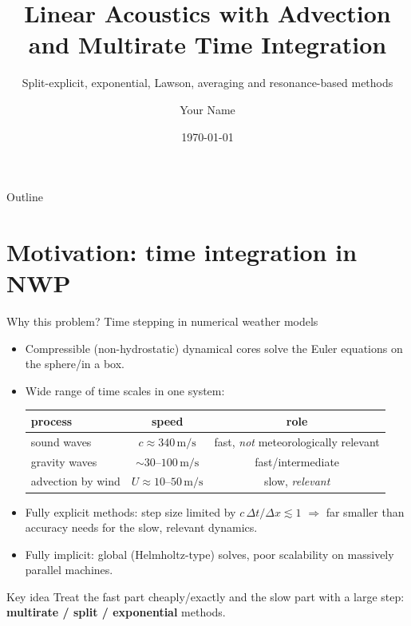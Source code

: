 \documentclass[aspectratio=169,10pt]{beamer}
\title[Acoustics with advection]{Linear Acoustics with Advection\\and Multirate Time Integration}
\subtitle{Split-explicit, exponential, Lawson, averaging and resonance-based methods}
\author{Your Name}
\institute[]{Your Institute}
\date{\today}
\begin{document}
	
	\begin{frame}
		\titlepage
	\end{frame}
	
	\begin{frame}{Outline}
		\tableofcontents
	\end{frame}
	
	\section{Motivation: time integration in NWP}
	
	\begin{frame}{Why this problem? Time stepping in numerical weather models}
		\begin{itemize}
			\item Compressible (non-hydrostatic) dynamical cores solve the Euler equations on the sphere/in a box.
			\item Wide range of time scales in one system:
			\begin{center}
				\begin{tabular}{lcc}
					\toprule
					process & speed & role\\
					\midrule
					sound waves & $c\approx 340\,\mathrm{m/s}$ & fast, \emph{not} meteorologically relevant\\
					gravity waves & $\sim 30$--$100\,\mathrm{m/s}$ & fast/intermediate\\
					advection by wind & $U\approx 10$--$50\,\mathrm{m/s}$ & slow, \emph{relevant}\\
					\bottomrule
				\end{tabular}
			\end{center}
			\item Fully explicit methods: step size limited by $c\,\Delta t/\Delta x \lesssim 1$ \;$\Rightarrow$\; far smaller than accuracy needs for the slow, relevant dynamics.
			\item Fully implicit: global (Helmholtz-type) solves, poor scalability on massively parallel machines.
		\end{itemize}
		\vspace{0.5em}
		\begin{alertblock}{Key idea}
			Treat the fast part cheaply/exactly and the slow part with a large step: \textbf{multirate / split / exponential} methods.
		\end{alertblock}
	\end{frame}
	
\end{document}

